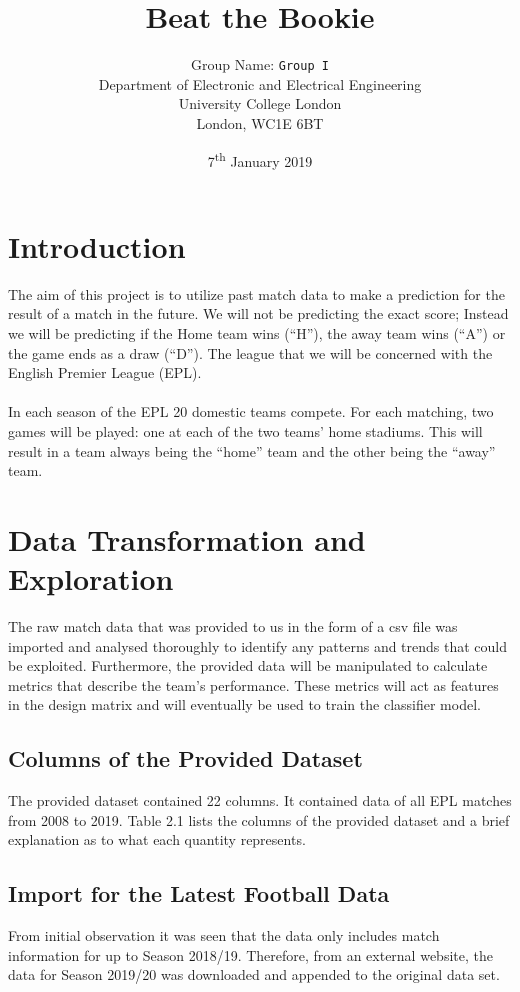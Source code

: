 \documentclass[a4paper,12pt]{article}
\title{Beat the Bookie}
\author
{
	Group Name: \texttt{Group I}\\
	Department of Electronic and Electrical Engineering\\
	University College London\\
	London, WC1E 6BT\\
}
\date{7\textsuperscript{th} January 2019}
\begin{document}
	
	\maketitle
	
	\section{Introduction}
	
	The aim of this project is to utilize past match data to make a prediction for the result of a match in the future. We will not be predicting the exact score; Instead we will be predicting if the Home team wins (“H”), the away team wins (“A”) or the game ends as a draw (“D”). The league that we will be concerned with the English Premier League (EPL).\\
	\\
	In each season of the EPL 20 domestic teams compete. For each matching, two games will be played: one at each of the two teams’ home stadiums. This will result in a team always being the “home” team and the other being the “away” team.  
	
	\section{Data Transformation and Exploration}
	
	The raw match data that was provided to us in the form of a csv file was imported and analysed thoroughly to identify any patterns and trends that could be exploited. Furthermore, the provided data will be manipulated to calculate metrics that describe the team’s performance. These metrics will act as features in the design matrix and will eventually be used to train the classifier model. 
	
	\subsection{Columns of the Provided Dataset }
	
	The provided dataset contained 22 columns. It contained data of all EPL matches from 2008 to 2019. Table 2.1 lists the columns of the provided dataset and a brief explanation as to what each quantity represents.
	
	\subsection{Import for the Latest Football Data}
	From initial observation it was seen that the data only includes match information for up to Season 2018/19. Therefore, from an external website, the data for Season 2019/20 was downloaded and appended to the original data set.
	
\end{document}
